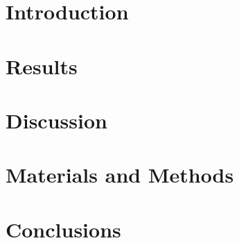\documentclass[journal,article,submit,moreauthors,pdftex]{Definitions/mdpi}
\begin{document}

\section{Introduction}


 
\section{Results}


\section{Discussion}


\section{Materials and Methods}


\section{Conclusions}



\vspace{6pt} 



\authorcontributions{}



\conflictsofinterest{} 
\end{document}
